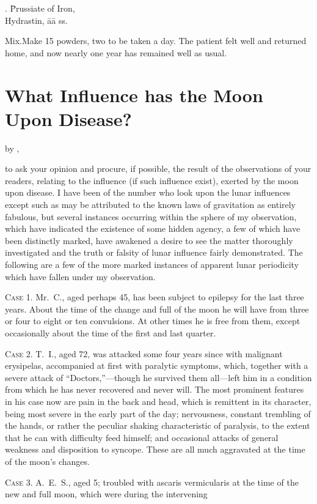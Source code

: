 
\begin{center}
\begin{tabbing}
  \prescription. \= Prussiate of Iron,  \\
    \> Hydrastin, āā \dram{} ss.
\end{tabbing}
\end{center}
Mix.\quad{}Make 15 powders, two to be taken a day. The patient felt
well and returned home, and now nearly one year has remained well as
usual.


\section*{What Influence has the Moon Upon Disease?}

by ,\ \md

 to ask your opinion and procure, if possible, the result of the
observations of your readers, relating to the influence (if such influence
exist), exerted by the moon upon disease. I have been of the number
who look upon the lunar influences except such as may be attributed to
the known laws of gravitation as entirely fabulous, but several instances
occurring within the sphere of my observation, which have indicated
the existence of some hidden agency, a few of which have been distinctly
marked, have awakened a desire to see the matter thoroughly
investigated and the truth or falsity of lunar influence fairly demonstrated.
The following are a few of the more marked instances of apparent lunar
periodicity which have fallen under my observation.

\textsc{Case 1.} Mr.~C., aged perhaps 45, has been subject to epilepsy for
the last three years. About the time of the change and full of the
moon he will have from three or four to eight or ten convulsions. At
other times he is free from them, except occasionally about the time of
the first and last quarter.

\textsc{Case 2.} T.~I., aged 72, was attacked some four years since with malignant
erysipelas, accompanied at first with paralytic symptoms,
which, together with a severe attack of ``Doctors,''---though he survived
them all---left him in a condition from which he has never recovered
and never will. The most prominent features in his case now
are pain in the back and head, which is remittent in its character,
being most severe in the early part of the day; nervousness, constant
trembling of the hands, or rather the peculiar shaking characteristic of
paralysis, to the extent that he can with difficulty feed himself; and
occasional attacks of general weakness and disposition to syncope.
These  are all much aggravated at the time of the moon's
changes.

\textsc{Case 3}. A.~E.~S., aged 5; troubled with ascaris vermicularis at
the time of the new and full moon, which were during the intervening\endinput
